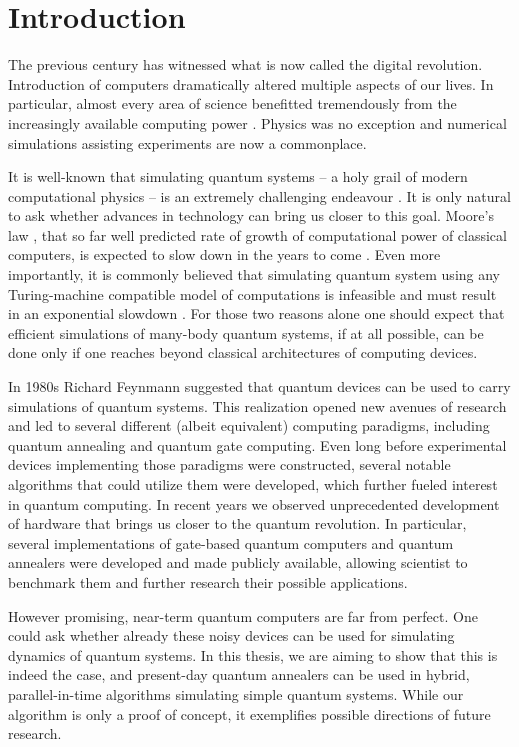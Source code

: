 \chapter*{Introduction}
The previous century has witnessed what is now called the digital revolution. Introduction of computers dramatically altered multiple aspects of our lives. In particular, almost every area of science benefitted tremendously from the increasingly available computing power \cite{winsberg}. Physics was no exception and numerical simulations assisting experiments are now a commonplace.

It is well-known that simulating quantum systems -- a holy grail of modern computational physics -- is an extremely challenging endeavour \cite{feynman.82}. It is only natural to ask whether advances in technology can bring us closer to this goal.  Moore's law \cite{mack}, that so far well predicted rate of growth of computational power of classical computers, is expected to slow down in the years to come \cite{waldrop, kumar}. Even more importantly, it is commonly believed that simulating quantum system using any Turing-machine compatible model of computations is infeasible and must result in an exponential slowdown \cite{feynman.82, poplavskii}. For those two reasons alone one should expect that efficient simulations of many-body quantum systems, if at all possible, can be done only if one reaches beyond classical architectures of computing devices.

In 1980s Richard Feynmann suggested that quantum devices can be used to carry simulations of quantum systems. This realization opened new avenues of research and led to several different (albeit equivalent) computing paradigms, including quantum annealing and quantum gate computing. Even long before experimental devices implementing those paradigms were constructed, several notable algorithms that could utilize them were developed, which further fueled interest in quantum computing. In recent years we observed unprecedented development of hardware that brings us closer to the quantum revolution. In particular, several implementations of gate-based quantum computers and quantum annealers were developed and made publicly available, allowing scientist to benchmark them and further research their possible applications.

However promising, near-term quantum computers are far from perfect. One could ask whether already these noisy devices can be used for simulating dynamics of quantum systems. In this thesis, we are aiming to show that this is indeed the case, and present-day quantum annealers can be used in hybrid, parallel-in-time algorithms simulating simple quantum systems. While our algorithm is only a proof of concept, it exemplifies possible directions of future research.

